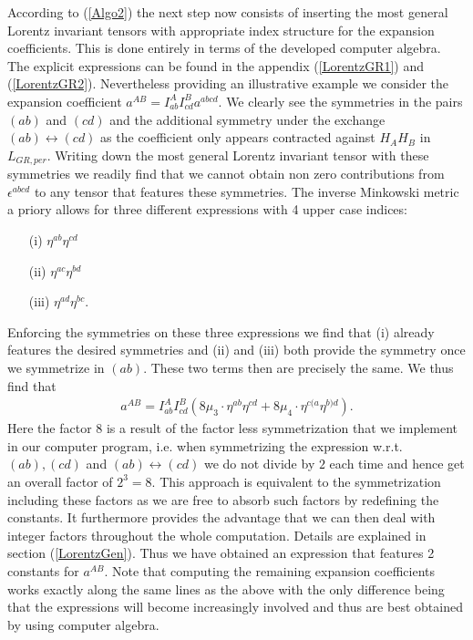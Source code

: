 \documentclass[a4paper,12pt, DIV=14, BCOR=5mm, twoside, headsepline]{scrbook}
\begin{document}
According to (\ref{Algo2}) the next step now consists of inserting the most general Lorentz invariant tensors with appropriate index structure for the expansion coefficients. This is done entirely in terms of the developed computer algebra. The explicit expressions can be found in the appendix (\ref{LorentzGR1}) and (\ref{LorentzGR2}).
Nevertheless providing an illustrative example we consider the expansion coefficient $a^{AB} = I^{A}_{ab}I^{B}_{cd}a^{abcd}$. We clearly see the symmetries in the pairs $(ab)$ and $(cd)$ and the additional symmetry under the exchange $(ab) \leftrightarrow (cd)$ as the coefficient only appears contracted against $H_AH_B$ in $L_{GR,per}$. Writing down the most general Lorentz invariant tensor with these symmetries we readily find that we cannot obtain non zero contributions from $\epsilon^{abcd}$ to any tensor that features these symmetries. The inverse Minkowski metric a priory allows for three different expressions with 4 upper case indices:
\begin{itemize}
    \item[(i)] $\eta^{ab} \eta^{cd}$ 
    \item[(ii)] $\eta^{ac} \eta^{bd}$ 
    \item[(iii)] $\eta^{ad} \eta^{bc}$.
\end{itemize}
Enforcing the symmetries on these three expressions we find that (i) already features the desired symmetries and (ii) and (iii) both provide the symmetry once we symmetrize in $(ab)$. These two terms then are precisely the same. We thus find that 
\begin{align}\label{ansatzExample}
    a^{AB} = I^{A}_{ab}I^{B}_{cd} \left ( 8\mu_3 \cdot \eta^{ab}\eta^{cd} + 8\mu_4 \cdot \eta^{c(a} \eta^{b)d}   \right ).
\end{align}
Here the factor $8$ is a result of the factor less symmetrization that we implement in our computer program, i.e. when symmetrizing the expression w.r.t. $(ab),(cd)$ and $(ab) \leftrightarrow (cd) $ we do not divide by $2$ each time and hence get an overall factor of $2^3=8$. This approach is equivalent to the symmetrization including these factors as we are free to absorb such factors by redefining the constants. It furthermore provides the advantage that we can then deal with integer factors throughout the whole computation. Details are explained in section (\ref{LorentzGen}).
Thus we have obtained an expression that features 2 constants for $a^{AB}$.
Note that computing the remaining expansion coefficients works exactly along the same lines as the above with the only difference being that the expressions will become increasingly involved and thus are best obtained by using computer algebra.
\end{document}
